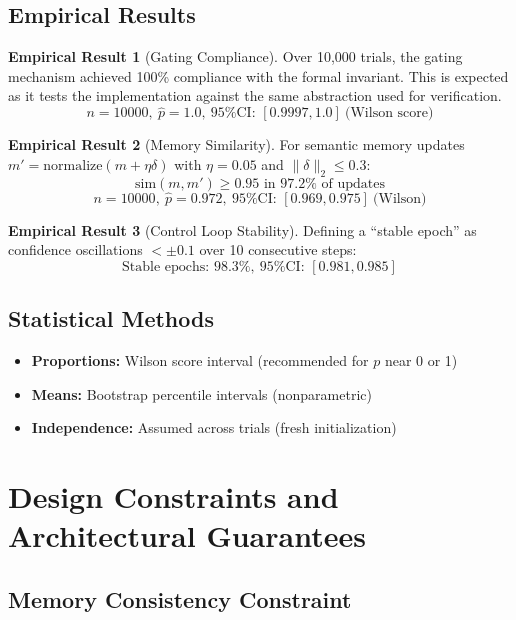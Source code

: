 \documentclass[12pt]{article}
\theoremstyle{definition}
\newtheorem{empirical}{Empirical Result}[section]
\begin{document}
\subsection{Empirical Results}

\begin{empirical}[Gating Compliance]
Over 10,000 trials, the gating mechanism achieved 100\% compliance with the formal invariant. This is expected as it tests the implementation against the same abstraction used for verification.
\[
n = 10000,\ \hat{p} = 1.0,\ \text{95\% CI: } [0.9997, 1.0]\ \text{(Wilson score)}
\]
\end{empirical}

\begin{empirical}[Memory Similarity]
For semantic memory updates $m' = \text{normalize}(m + \eta \delta)$ with $\eta=0.05$ and $\|\delta\|_2 \leq 0.3$:
\[
\text{sim}(m, m') \geq 0.95 \text{ in } 97.2\% \text{ of updates}
\]
\[
n = 10000,\ \hat{p} = 0.972,\ \text{95\% CI: } [0.969, 0.975]\ \text{(Wilson)}
\]
\end{empirical}

\begin{empirical}[Control Loop Stability]
Defining a ``stable epoch'' as confidence oscillations $<\pm 0.1$ over 10 consecutive steps:
\[
\text{Stable epochs: } 98.3\%,\ \text{95\% CI: } [0.981, 0.985]
\]
\end{empirical}

\subsection{Statistical Methods}
\begin{itemize}
    \item \textbf{Proportions:} Wilson score interval (recommended for $p$ near 0 or 1)
    \item \textbf{Means:} Bootstrap percentile intervals (nonparametric)
    \item \textbf{Independence:} Assumed across trials (fresh initialization)
\end{itemize}

\section{Design Constraints and Architectural Guarantees}

\subsection{Memory Consistency Constraint}
\end{document}
